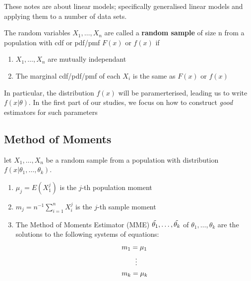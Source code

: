
These notes are about linear models; specifically generalised linear models and applying them to a number of data sets.


\begin{definition} The random variables $X_1, \dots, X_n$ are called a \textbf{random sample} of size n from a population with cdf or pdf/pmf $F(x)$ or $f(x)$ if
\begin{enumerate}
    \item $X_1,\dots, X_n$ are mutually independant
    \item The marginal cdf/pdf/pmf of each $X_i$ is the same as $F(x)$ or $f(x)$
\end{enumerate}
\end{definition}
In particular, the distribution $f(x)$ will be paramerterised, leading us to write $f(x | \theta)$. In the first part of our studies, we focus on how to construct \textit{good} estimators for such parameters

\subsection*{Method of Moments}

\begin{definition}
    let $X_1, \dots, X_n$ be a random sample from a population with distribution $f(x | \theta_1, \dots, \theta_k)$. 
    \begin{enumerate}
        \item $\mu_j = E(X_1^j)$ is the $j$-th population moment
        \item $m_j = n^{-1}\sum_{i=1}^{n} X_i^j$ is the $j$-th sample moment 
        \item The Method of Moments Estimator (MME) $\Tilde{\theta_1}, \dots, \Tilde{\theta_k}$ of $\theta_1, \dots, \theta_k$ are the solutions to the following systems of equations: 
        \begin{align*}
            & m_1 = \mu_1 \\
            & \hspace{7mm} \vdots \\
            & m_k = \mu_k
        \end{align*}
    \end{enumerate}
\end{definition}